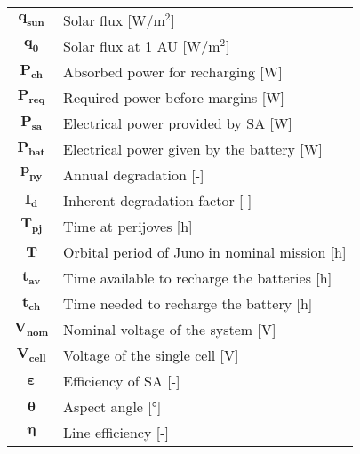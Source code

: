 \begin{multicols}{2}
{\begin{xltabular}{\linewidth}{c>{\raggedright\arraybackslash}X}
		$\boldsymbol{q_{sun}}$ & Solar flux [W/$\textrm{m}^2$] \\
		$\boldsymbol{q_{0}}$ & Solar flux at 1 AU [W/$\textrm{m}^2$] \\
		$\boldsymbol{P_{ch}}$ & Absorbed power for recharging [W] \\
		$\boldsymbol{P_{req}}$ & Required power before margins [W] \\
		$\boldsymbol{P_{sa}}$ & Electrical power provided by SA [W] \\
		$\boldsymbol{P_{bat}}$ & Electrical power given by the battery [W] \\
		$\boldsymbol{p_{py}}$ & Annual degradation [-] \\
		$\boldsymbol{I_{d}}$ & Inherent degradation factor [-] \\
		$\boldsymbol{T_{pj}}$ & Time at perijoves [h] \\
		$\boldsymbol{T}$ & Orbital period of Juno in nominal mission [h] \\
		$\boldsymbol{t_{av}}$ & Time available to recharge the batteries [h] \\
		$\boldsymbol{t_{ch}}$ & Time needed to recharge the battery [h] \\
		$\boldsymbol{V_{nom}}$ & Nominal voltage of the system [V] \\
		$\boldsymbol{V_{cell}}$ & Voltage of the single cell [V] \\
		$\boldsymbol{\varepsilon}$ & Efficiency of SA [-] \\
		$\boldsymbol{\theta}$ & Aspect angle [°] \\
		$\boldsymbol{\eta}$ &  Line efficiency [-]
 	\end{xltabular}
	\unskip
	\unpenalty
	\unpenalty}
	\unvbox\ltmcbox
\end{multicols}